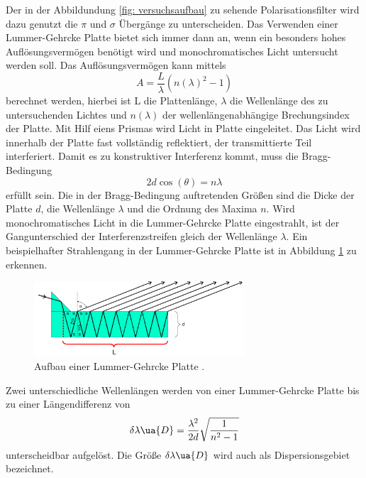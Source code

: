 Der in der Abbildundung \ref{fig: versuchsaufbau} zu sehende Polarisationsfilter wird dazu genutzt %
die $\pi$ und $\sigma$ Übergänge zu unterscheiden. Das Verwenden einer Lummer-Gehrcke Platte
bietet sich immer dann an, wenn ein besonders hohes Auflösungsvermögen benötigt wird
und monochromatisches Licht untersucht werden soll.
Das Auflösungsvermögen kann mittels
\begin{equation}
  \label{eq: auflösungsvermoegen_lummer}
  A=\frac{L}{\lambda}(n(\lambda)^2-1)
\end{equation}
berechnet werden, hierbei ist L die Plattenlänge, $\lambda$ die Wellenlänge
des zu untersuchenden Lichtes und $n(\lambda)$ der wellenlängenabhängige
Brechungsindex der Platte. Mit Hilf eiens Prismas wird Licht in Platte eingeleitet. %
Das Licht wird innerhalb der Platte fast vollständig reflektiert, der transmittierte
Teil interferiert. Damit es zu konstruktiver Interferenz kommt, muss die Bragg-Bedingung %
\begin{equation*}
  2d\cos(\theta)=n\lambda
\end{equation*}
erfüllt sein. Die in der Bragg-Bedingung auftretenden Größen sind die Dicke der Platte $d$,
die Wellenlänge $\lambda$ und die Ordnung des Maxima $n$. %
Wird monochromatisches Licht in die Lummer-Gehrcke Platte eingestrahlt, ist der
Gangunterschied der Interferenzstreifen gleich der Wellenlänge $\lambda$.
Ein beispielhafter Strahlengang in der Lummer-Gehrcke Platte ist in Abbildung \ref{fig: lummer} zu erkennen.
\FloatBarrier
\begin{figure}[h]
  \centering
  \includegraphics[width=0.7\textwidth]{pics/lummer.png}
  \caption{Aufbau einer Lummer-Gehrcke Platte \cite{anleitung27}.}
  \label{fig: lummer}
\end{figure}
\FloatBarrier
Zwei unterschiedliche Wellenlängen werden von einer Lummer-Gehrcke Platte bis zu
einer Längendifferenz von
\begin{equation}
  \label{eq: lummer_wellendif}
  \delta \lambda\ua{D}=\frac{\lambda^2}{2 d} \sqrt{\frac{1}{n^2-1}}
\end{equation}
unterscheidbar aufgelöst. Die Größe $\delta \lambda\ua{D}$ wird auch als Dispersionsgebiet
bezeichnet.

